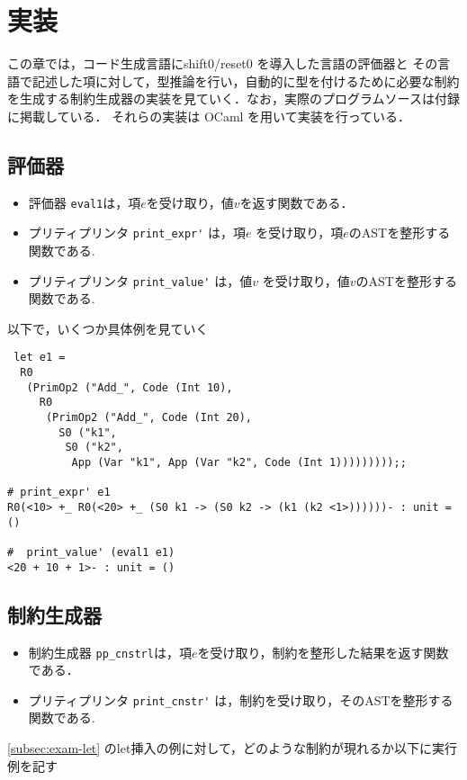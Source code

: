 \chapter{実装}
この章では，コード生成言語にshift0/reset0 を導入した言語の評価器と
その言語で記述した項に対して，型推論を行い，自動的に型を付けるために必要な制約を生成する制約生成器の実装を見ていく．なお，実際のプログラムソースは付録に掲載している．
それらの実装は OCaml を用いて実装を行っている．

\section{評価器}
\begin{itemize}
\item 評価器 \lstinline|eval1|は，項$e$を受け取り，値$v$を返す関数である．
\item プリティプリンタ \lstinline|print_expr'| は，項$e$ を受け取り，項$e$のASTを整形する関数である.
\item プリティプリンタ \lstinline|print_value'| は，値$v$ を受け取り，値$v$のASTを整形する関数である.
\end{itemize}

以下で，いくつか具体例を見ていく

\begin{lstlisting}
 let e1 =
  R0
   (PrimOp2 ("Add_", Code (Int 10),
     R0
      (PrimOp2 ("Add_", Code (Int 20),
        S0 ("k1",
         S0 ("k2",
          App (Var "k1", App (Var "k2", Code (Int 1)))))))));;

# print_expr' e1
R0(<10> +_ R0(<20> +_ (S0 k1 -> (S0 k2 -> (k1 (k2 <1>))))))- : unit = ()

#  print_value' (eval1 e1)
<20 + 10 + 1>- : unit = ()

\end{lstlisting}

\section{制約生成器}
\begin{itemize}
\item 制約生成器 \lstinline|pp_cnstrl|は，項$e$を受け取り，制約を整形した結果を返す関数である．
\item プリティプリンタ \lstinline|print_cnstr'| は，制約を受け取り，そのASTを整形する関数である.
\end{itemize}

\ref{subsec:exam-let} のlet挿入の例に対して，どのような制約が現れるか以下に実行例を記す

